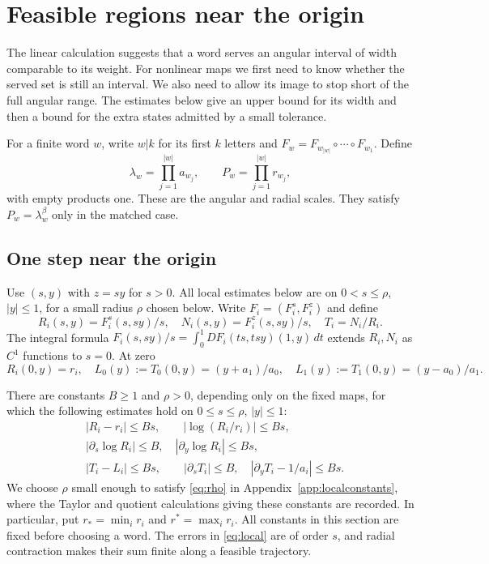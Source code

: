 \documentclass[11pt]{amsart}
\theoremstyle{definition}
\theoremstyle{remark}
\numberwithin{equation}{section}
\begin{document}
\section{Feasible regions near the origin}\label{sec:geometry}
The linear calculation suggests that a word serves an angular interval
of width comparable to its weight. For nonlinear maps we first need
to know whether the served set is still an interval. We also need
to allow its image to stop short of the full angular range. The
estimates below give an upper bound for its width and then a bound
for the extra states admitted by a small tolerance.

For a finite word $w$, write $w|k$ for its first $k$ letters and
$F_w=F_{w_{|w|}}\circ\cdots\circ F_{w_1}$. Define
\[
\lambda_w=\prod_{j=1}^{|w|}a_{w_j},\qquad
P_w=\prod_{j=1}^{|w|}r_{w_j},
\]
with empty products one. These are the angular and radial scales.
They satisfy $P_w=\lambda_w^\beta$ only in the matched case.

\subsection{One step near the origin}
Use \((s,y)\) with \(z=sy\) for \(s>0\). All local estimates
below are on \(0<s\le\rho\), \(|y|\le1\), for a small radius
$\rho$ chosen below. Write $F_i=(F_i^s,F_i^z)$ and define
\[
 R_i(s,y)=F_i^s(s,sy)/s,\quad
 N_i(s,y)=F_i^z(s,sy)/s,\quad T_i=N_i/R_i.
\]
The integral formula
\(F_i(s,sy)/s=\int_0^1DF_i(ts,tsy)(1,y)\,dt\)
extends \(R_i,N_i\) as \(C^1\) functions to \(s=0\).
At zero
\begin{equation}
R_i(0,y)=r_i,\quad
 L_0(y):=T_0(0,y)=(y+a_1)/a_0,\quad
 L_1(y):=T_1(0,y)=(y-a_0)/a_1.                                \label{eq:limangular}
\end{equation}

There are constants $B\ge1$ and $\rho>0$, depending only on the
fixed maps, for which the following estimates hold on
$0\le s\le\rho$, $|y|\le1$:
\begin{equation}
\begin{split}
 &|R_i-r_i|\le Bs,\qquad |\log(R_i/r_i)|\le Bs,\\
 &|\partial_s\log R_i|\le B,
          \quad |\partial_y\log R_i|\le Bs,\\
 &|T_i-L_i|\le Bs,\qquad |\partial_sT_i|\le B,
          \quad |\partial_yT_i-1/a_i|\le Bs .                 \label{eq:local}
\end{split}
\end{equation}
We choose $\rho$ small enough to satisfy \eqref{eq:rho} in
Appendix~\ref{app:localconstants}, where the Taylor and quotient
calculations giving these constants are recorded. In particular,
put $r_* =\min_i r_i$ and $r^*=\max_i r_i$. All constants in
this section are fixed before choosing a word. The errors in
\eqref{eq:local} are of order $s$, and radial contraction makes
their sum finite along a feasible trajectory.
\end{document}
